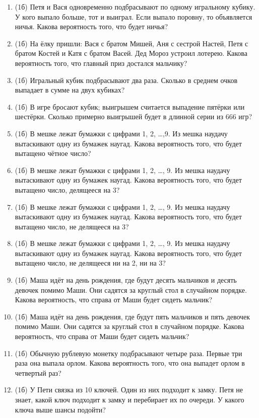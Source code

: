 \documentclass[a4paper, 12pt]{article}
\begin{document}

\begin{enumerate}
\item (1б) Петя и Вася одновременно подбрасывают по одному игральному кубику. У кого выпало больше, тот и выиграл. Если выпало поровну, то объявляется ничья. Какова вероятность того, что будет ничья?
\item (1б) На ёлку пришли: Вася с братом Мишей, Аня с сестрой Настей, Петя с братом Костей и Катя с братом Васей. Дед Мороз устроил лотерею. Какова вероятность того, что главный приз достался мальчику?
\item (1б) Игральный кубик подбрасывают два раза. Сколько в среднем очков выпадает в сумме на двух кубиках?
\item (1б) В игре бросают кубик; выигрышем считается выпадение пятёрки или шестёрки. Сколько примерно выигрышей будет в длинной серии из 666 игр?
\item (1б) В мешке лежат бумажки с цифрами 1, 2, \ldots ,9. Из мешка наудачу вытаскивают одну из бумажек наугад. Какова вероятность того, что будет вытащено чётное число?
\item (1б) В мешке лежат бумажки с цифрами 1, 2, \ldots, 9. Из мешка наудачу вытаскивают одну из бумажек наугад. Какова вероятность того, что будет вытащено число, делящееся на 3?
\item (1б) В мешке лежат бумажки с цифрами 1, 2, \ldots, 9. Из мешка наудачу вытаскивают одну из бумажек наугад. Какова вероятность того, что будет вытащено число, не делящееся на 3?
\item (1б) В мешке лежат бумажки с цифрами 1, 2, \ldots, 9. Из мешка наудачу вытаскивают одну из бумажек наугад. Какова вероятность того, что будет вытащено число, не делящееся ни на 2, ни на 3?
\item (1б) Маша идёт на день рождения, где будут десять мальчиков и десять девочек помимо Маши. Они садятся за круглый стол в случайном порядке. Какова вероятность, что справа от Маши будет сидеть мальчик?
\item (1б) Маша идёт на день рождения, где будут пять мальчиков и пять девочек помимо Маши. Они садятся за круглый стол в случайном порядке. Какова вероятность, что справа от Маши будет сидеть мальчик?
\item (1б) Обычную рублевую монетку подбрасывают четыре раза. Первые три раза она выпала орлом. Какова вероятность того, что она выпадет орлом в четвертый раз?
\item (1б) У Пети связка из 10 ключей. Один из них подходит к замку. Петя не знает, какой ключ подходит к замку и перебирает их по очереди. У какого ключа выше шансы подойти?

\end{enumerate}
\end{document}
